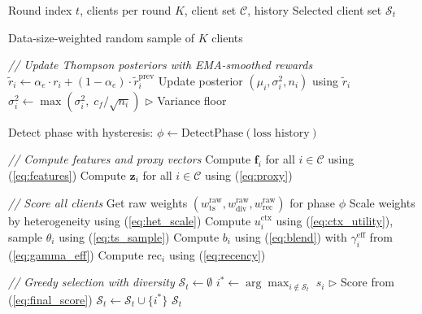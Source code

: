 \documentclass[journal]{IEEEtran}
\begin{document}
\begin{algorithm}[t]
\caption{\small APEX: Adaptive Phase-Aware Exploration}
\label{alg:apex}
\begin{algorithmic}[1]
\small
\renewcommand{\algorithmicrequire}{\textbf{Input:}}
\renewcommand{\algorithmicensure}{\textbf{Output:}}
\REQUIRE Round index $t$, clients per round $K$, client set $\mathcal{C}$, history
\ENSURE Selected client set $\mathcal{S}_t$

    \RETURN Data-size-weighted random sample of $K$ clients
\ENDIF

\STATE \textit{// Update Thompson posteriors with EMA-smoothed rewards}
    \STATE $\tilde{r}_i \leftarrow \alpha_e \cdot r_i + (1 - \alpha_e) \cdot \tilde{r}_i^{\text{prev}}$
    \STATE Update posterior $(\mu_i, \sigma^2_i, n_i)$ using $\tilde{r}_i$
    \STATE $\sigma^2_i \leftarrow \max(\sigma^2_i, \; c_f / \sqrt{n_i})$ \hfill $\triangleright$ Variance floor
\ENDFOR

\STATE Detect phase with hysteresis: $\phi \leftarrow \text{DetectPhase}(\text{loss history})$

\STATE \textit{// Compute features and proxy vectors}
\STATE Compute $\bm{f}_i$ for all $i \in \mathcal{C}$ using (\ref{eq:features})
\STATE Compute $\bm{z}_i$ for all $i \in \mathcal{C}$ using (\ref{eq:proxy})

\STATE \textit{// Score all clients}
\STATE Get raw weights $(w_{\text{ts}}^{\text{raw}}, w_{\text{div}}^{\text{raw}}, w_{\text{rec}}^{\text{raw}})$ for phase $\phi$
\STATE Scale weights by heterogeneity using (\ref{eq:het_scale})
    \STATE Compute $u_i^{\text{ctx}}$ using (\ref{eq:ctx_utility}), sample $\theta_i$ using (\ref{eq:ts_sample})
    \STATE Compute $b_i$ using (\ref{eq:blend}) with $\gamma_i^{\text{eff}}$ from (\ref{eq:gamma_eff})
    \STATE Compute $\text{rec}_i$ using (\ref{eq:recency})
\ENDFOR

\STATE \textit{// Greedy selection with diversity}
\STATE $\mathcal{S}_t \leftarrow \emptyset$
    \STATE $i^* \leftarrow \arg\max_{i \notin \mathcal{S}_t} \; s_i$ \hfill $\triangleright$ Score from (\ref{eq:final_score})
    \STATE $\mathcal{S}_t \leftarrow \mathcal{S}_t \cup \{i^*\}$
\ENDFOR
\RETURN $\mathcal{S}_t$
\end{algorithmic}
\end{algorithm}

\end{document}
